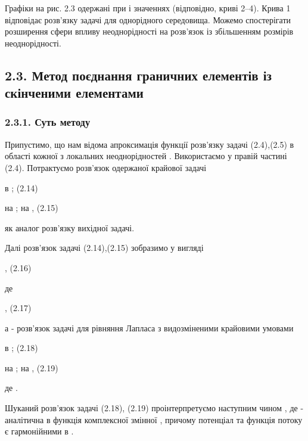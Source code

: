 Графіки на рис. 2.3 одержані при і значеннях (відповідно, криві 2--4).
Крива 1 відповідає розв'язку задачі для однорідного середовища. Можемо
спостерігати розширення сфери впливу неоднорідності на розв'язок із
збільшенням розмірів неоднорідності.

\hypertarget{ux43cux435ux442ux43eux434-ux43fux43eux454ux434ux43dux430ux43dux43dux44f-ux433ux440ux430ux43dux438ux447ux43dux438ux445-ux435ux43bux435ux43cux435ux43dux442ux456ux432-ux456ux437-ux441ux43aux456ux43dux447ux435ux43dux438ux43cux438-ux435ux43bux435ux43cux435ux43dux442ux430ux43cux438}{%
\subsection{2.3. Метод поєднання граничних елементів із скінченими
елементами}\label{ux43cux435ux442ux43eux434-ux43fux43eux454ux434ux43dux430ux43dux43dux44f-ux433ux440ux430ux43dux438ux447ux43dux438ux445-ux435ux43bux435ux43cux435ux43dux442ux456ux432-ux456ux437-ux441ux43aux456ux43dux447ux435ux43dux438ux43cux438-ux435ux43bux435ux43cux435ux43dux442ux430ux43cux438}}

\hypertarget{ux441ux443ux442ux44c-ux43cux435ux442ux43eux434ux443-1}{%
\subsubsection{2.3.1. Суть
методу}\label{ux441ux443ux442ux44c-ux43cux435ux442ux43eux434ux443-1}}

Припустимо, що нам відома апроксимація функції розв'язку задачі
(2.4),(2.5) в області кожної з локальних неоднорідностей . Використаємо
у правій частині (2.4). Потрактуємо розв'язок одержаної крайової задачі

в ; (2.14)

на ; на , (2.15)

як аналог розв'язку вихідної задачі.

Далі розв'язок задачі (2.14),(2.15) зобразимо у вигляді

, (2.16)

де

, (2.17)

а - розв'язок задачі для рівняння Лапласа з видозміненими крайовими
умовами

в ; (2.18)

на ; на , (2.19)

де .

Шуканий розв'язок задачі (2.18), (2.19) проінтерпретуємо наступним чином
, де - аналітична в функція комплексної змінної , причому потенціал та
функція потоку є гармонійними в .

